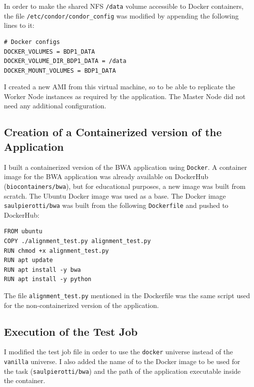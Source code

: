 \documentclass{article}
\begin{document}
In order to make the shared NFS \texttt{/data} volume accessible to Docker containers, the file \texttt{/etc/condor/condor\_config} was modified by appending the following lines to it:
\begin{lstlisting}
# Docker configs
DOCKER_VOLUMES = BDP1_DATA
DOCKER_VOLUME_DIR_BDP1_DATA = /data
DOCKER_MOUNT_VOLUMES = BDP1_DATA
\end{lstlisting}

I created a new AMI from this virtual machine, so to be able to replicate the Worker Node instances as required by the application.
The Master Node did not need any additional configuration.

\subsection{Creation of a Containerized version of the Application}
I built a containerized version of the BWA application using \texttt{Docker}.
A container image for the BWA application was already available on DockerHub (\texttt{biocontainers/bwa}), but for educational purposes, a new image was built from scratch.
The Ubuntu Docker image was used as a base.
The Docker image \texttt{saulpierotti/bwa} was built from the following \texttt{Dockerfile} and pushed to DockerHub:

\begin{lstlisting}
FROM ubuntu
COPY ./alignment_test.py alignment_test.py
RUN chmod +x alignment_test.py
RUN apt update
RUN apt install -y bwa
RUN apt install -y python
\end{lstlisting}

The file \texttt{alignment\_test.py} mentioned in the Dockerfile was the same script used for the non-containerized version of the application.

\subsection{Execution of the Test Job}
I modified the test job file in order to use the \texttt{docker} universe instead of the \texttt{vanilla} universe.
I also added the name of to the Docker image to be used for the task (\texttt{saulpierotti/bwa}) and the path of the application executable inside the container.
\end{document}
